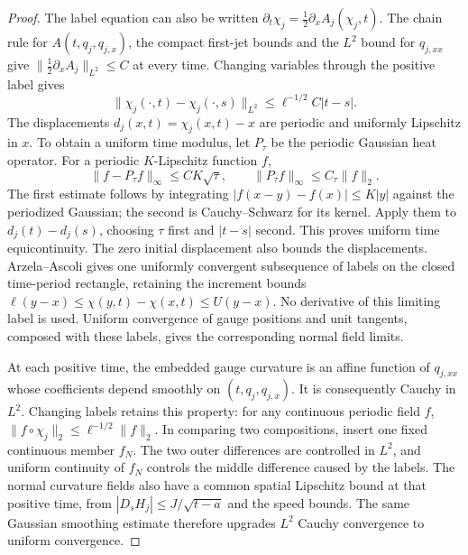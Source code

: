 \begin{proof}
The label equation can also be written
$\partial_t\chi_j=\tfrac12\partial_xA_j(\chi_j,t)$.
The chain rule for $A(t,q_j,q_{j,x})$, the compact first-jet bounds
and the $L^2$ bound for $q_{j,xx}$ give
$\|\tfrac12\partial_xA_j\|_{L^2}\le C$ at every time.
Changing variables through the positive label gives
\[
 \|\chi_j(\cdot,t)-\chi_j(\cdot,s)\|_{L^2}
                    \le \ell^{-1/2}C|t-s|.
\]
The displacements $d_j(x,t)=\chi_j(x,t)-x$ are periodic and
uniformly Lipschitz in $x$.  To obtain a uniform time modulus,
let $P_\tau$ be the periodic Gaussian heat operator.  For a
periodic $K$-Lipschitz function $f$,
\[
 \|f-P_\tau f\|_\infty\le C K\sqrt{\tau},
 \qquad
 \|P_\tau f\|_\infty\le C_\tau\|f\|_2.
\]
The first estimate follows by integrating
$|f(x-y)-f(x)|\le K|y|$ against the periodized Gaussian;
the second is Cauchy--Schwarz for its kernel.
Apply them to $d_j(t)-d_j(s)$, choosing $\tau$ first and
$|t-s|$ second.  This proves uniform time equicontinuity.
The zero initial displacement also bounds the displacements.
Arzela--Ascoli gives one uniformly convergent subsequence of
labels on the closed time-period rectangle, retaining
the increment bounds $\ell(y-x)\le\chi(y,t)-\chi(x,t)\le U(y-x)$.
No derivative of this limiting label is used.
Uniform convergence of gauge positions and unit tangents,
composed with these labels, gives the corresponding normal
field limits.

At each positive time, the embedded gauge curvature is an
affine function of $q_{j,xx}$ whose coefficients depend smoothly
on $(t,q_j,q_{j,x})$.  It is consequently Cauchy in $L^2$.
Changing labels retains this property: for any continuous
periodic field $f$,
$\|f\circ\chi_j\|_2\le\ell^{-1/2}\|f\|_2$.
In comparing two compositions, insert one fixed continuous
member $f_N$.  The two outer differences are controlled in
$L^2$, and uniform continuity of $f_N$ controls the middle
difference caused by the labels.  The normal curvature fields
also have a common spatial Lipschitz bound at that positive
time, from $|D_sH_j|\le J/\sqrt{t-a}$ and the speed bounds.
The same Gaussian smoothing estimate therefore upgrades
$L^2$ Cauchy convergence to uniform convergence.


\end{proof}

